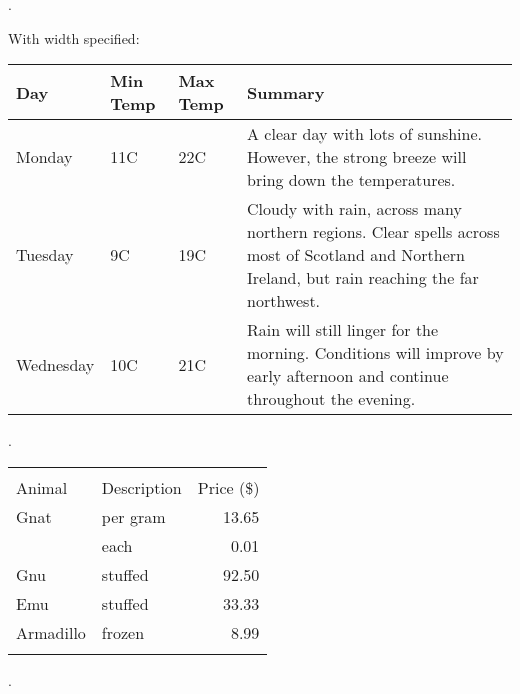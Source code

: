 \documentclass{article}
\begin{document}
{
.\newline\newline\newline
}



With width specified:
\begin{center}
    \begin{tabular}{ | l | l | l | p{5cm} |}
    \hline
    Day & Min Temp & Max Temp & Summary \\ \hline
    Monday & 11C & 22C & A clear day with lots of sunshine.  
    However, the strong breeze will bring down the temperatures. \\ \hline
    Tuesday & 9C & 19C & Cloudy with rain, across many northern regions. Clear spells 
    across most of Scotland and Northern Ireland, 
    but rain reaching the far northwest. \\ \hline
    Wednesday & 10C & 21C & Rain will still linger for the morning. 
    Conditions will improve by early afternoon and continue 
    throughout the evening. \\
    \hline
    \end{tabular}
\end{center}





{
.\newline\newline\newline
}








\begin{tabular}{ | l | l | r | }
  \hline\noalign{\smallskip}
  \multicolumn{2}{c}{Item} \\
  \cline{1-2}\noalign{\smallskip}
  Animal & Description & Price (\$) \\
  \noalign{\smallskip}\hline\noalign{\smallskip}
  Gnat  & per gram & 13.65 \\
        & each     &  0.01 \\
  Gnu   & stuffed  & 92.50 \\
  Emu   & stuffed  & 33.33 \\
  Armadillo & frozen & 8.99 \\
  \noalign{\smallskip}\hline
\end{tabular}




{
.\newline\newline\newline
}
\end{document}

